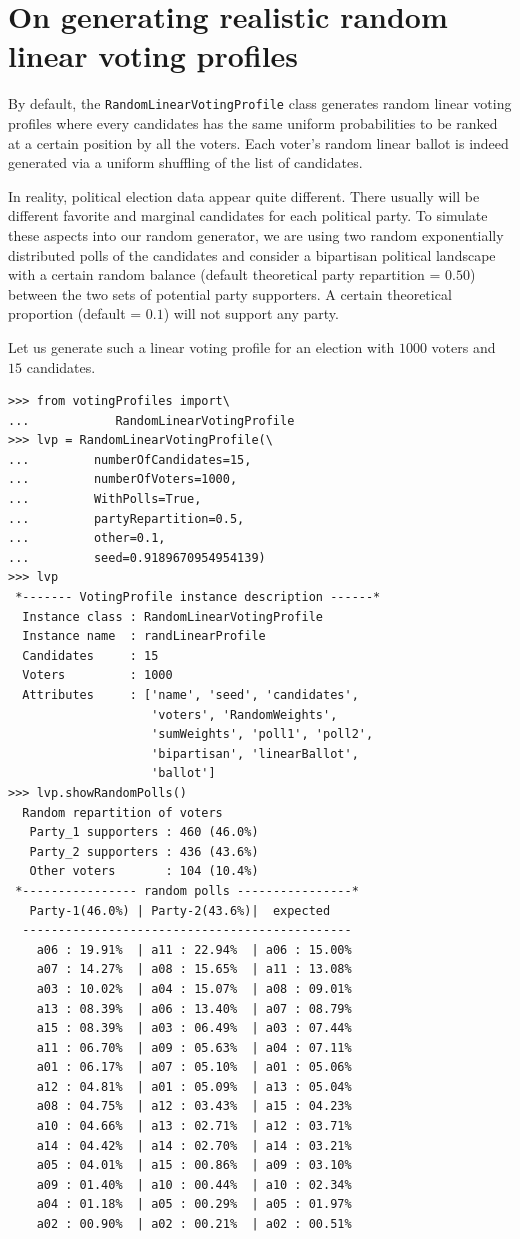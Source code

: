\section{On generating realistic random linear voting profiles}
\label{sec:7.5}

By default, the \texttt{RandomLinearVotingProfile} class generates random linear voting profiles where every candidates has the same uniform probabilities to be ranked at a certain position by all the voters. Each voter's random linear ballot is indeed generated  via a uniform shuffling of the list of candidates.

In reality, political election data appear quite different. There usually will be different favorite and marginal candidates for each political party. To simulate these aspects into our random generator, we are using two random exponentially distributed polls of the candidates and consider a bipartisan political landscape with a certain random balance (default theoretical party repartition = $0.50$) between the two sets of potential party supporters. A certain theoretical proportion (default = $0.1$) will not support any party.

Let us generate such a linear voting profile for an election with $1000$ voters and $15$ candidates.

\begin{lstlisting}[caption={Generating a linear voting profile with random polls},label=list:7.7]
>>> from votingProfiles import\
...            RandomLinearVotingProfile
>>> lvp = RandomLinearVotingProfile(\
...         numberOfCandidates=15,
...         numberOfVoters=1000,
...         WithPolls=True,
...         partyRepartition=0.5,
...         other=0.1,
...         seed=0.9189670954954139)
>>> lvp
 *------- VotingProfile instance description ------*
  Instance class : RandomLinearVotingProfile
  Instance name  : randLinearProfile
  Candidates     : 15
  Voters         : 1000
  Attributes     : ['name', 'seed', 'candidates',
                    'voters', 'RandomWeights',
                    'sumWeights', 'poll1', 'poll2',
                    'bipartisan', 'linearBallot',
                    'ballot']
>>> lvp.showRandomPolls()
  Random repartition of voters
   Party_1 supporters : 460 (46.0%)
   Party_2 supporters : 436 (43.6%)
   Other voters       : 104 (10.4%)
 *---------------- random polls ----------------*
   Party-1(46.0%) | Party-2(43.6%)|  expected  
  ----------------------------------------------
    a06 : 19.91%  | a11 : 22.94%  | a06 : 15.00%
    a07 : 14.27%  | a08 : 15.65%  | a11 : 13.08%
    a03 : 10.02%  | a04 : 15.07%  | a08 : 09.01%
    a13 : 08.39%  | a06 : 13.40%  | a07 : 08.79%
    a15 : 08.39%  | a03 : 06.49%  | a03 : 07.44%
    a11 : 06.70%  | a09 : 05.63%  | a04 : 07.11%
    a01 : 06.17%  | a07 : 05.10%  | a01 : 05.06%
    a12 : 04.81%  | a01 : 05.09%  | a13 : 05.04%
    a08 : 04.75%  | a12 : 03.43%  | a15 : 04.23%
    a10 : 04.66%  | a13 : 02.71%  | a12 : 03.71%
    a14 : 04.42%  | a14 : 02.70%  | a14 : 03.21%
    a05 : 04.01%  | a15 : 00.86%  | a09 : 03.10%
    a09 : 01.40%  | a10 : 00.44%  | a10 : 02.34%
    a04 : 01.18%  | a05 : 00.29%  | a05 : 01.97%
    a02 : 00.90%  | a02 : 00.21%  | a02 : 00.51%
\end{lstlisting}

